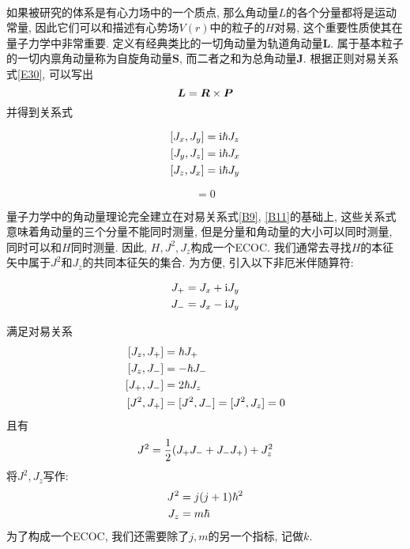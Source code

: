 \documentclass[UTF8]{ctexart}
\numberwithin{equation}{subsection}
\newcommand{\nts}[1]{
    \begin{center}
        \begin{notices}{}{}
            #1
        \end{notices}
    \end{center}
}
\newcommand{\ntswd}[1]{
    \begin{center}
        \begin{noticeswd}{}{}
            #1
        \end{noticeswd}
    \end{center}
}
\begin{document}

\ 


如果被研究的体系是有心力场中的一个质点, 那么角动量$L$的各个分量都将是运动常量, 因此它们可以和描述有心势场$V(r)$中的粒子的$H$对易, 这个重要性质使其在量子力学中非常重要. 
定义有经典类比的一切角动量为轨道角动量$\bm{L}$. 属于基本粒子的一切内禀角动量称为自旋角动量$\bm{S}$, 而二者之和为总角动量$\bm{J}$.
根据正则对易关系式\ref{E30}, 可以写出
$$\bm{L}=\bm{R}\times\bm{P}$$
并得到关系式
\ntswd{\begin{equation}
    \ar{
    [J_x,J_y] \x \i\hbar J_z\\
    [J_y,J_z] \x \i\hbar J_x\\
    [J_z,J_x] \x \i\hbar J_y
}\label{B9}\end{equation}}
\ntswd{\begin{equation}
    [\bm{J}^2,\bm{J}]=0 \label{B11}
\end{equation}}
量子力学中的角动量理论完全建立在对易关系式\ref{B9}, \ref{B11}的基础上, 这些关系式意味着角动量的三个分量不能同时测量, 但是分量和角动量的大小可以同时测量, 同时可以和$H$同时测量. 因此, $H,J^2,J_z$构成一个ECOC. 我们通常去寻找$H$的本征矢中属于$J^2$和$J_z$的共同本征矢的集合.
\sub{定义与符号}
为方便, 引入以下非厄米伴随算符:
\nts{$$\begin{aligned} 
    J_+ &= J_x+\mathrm{i} J_y\\
    J_- &= J_x-\mathrm{i} J_y
 \end{aligned}$$}
满足对易关系
$$\ar{
    [J_z,J_+] \x \hbar J_+\\
    [J_z,J_-] \x -\hbar J_-\\
    [J_+,J_-] \x 2\hbar J_z\\
    [J^2,J_+] \x [J^2,J_-] = [J^2,J_z] = 0
}$$
且有
$$J^2=\frac{1}{2}(J_+J_-+J_-J_+)+J_z^2$$
将$J^2, J_z$写作:
$$\begin{aligned} 
    J^2 &= j(j+1)\hbar^2\\
    J_z &= m\hbar
 \end{aligned}$$
为了构成一个ECOC, 我们还需要除了$j,m$的另一个指标, 记做$k$.
\end{document}
